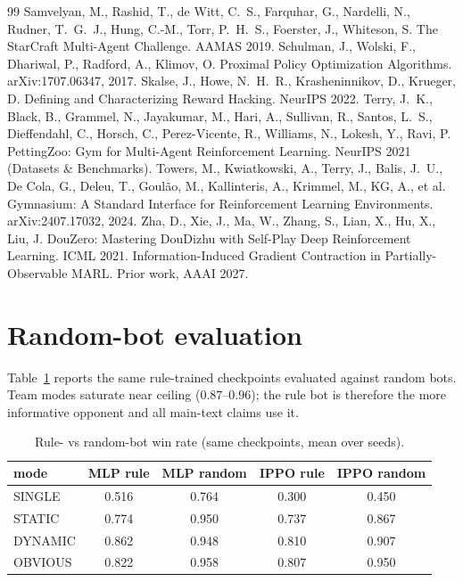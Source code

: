 \documentclass{article}
\begin{document}
\begin{thebibliography}{99}
 Samvelyan, M., Rashid, T., de Witt, C.~S., Farquhar, G., Nardelli, N., Rudner, T.~G.~J., Hung, C.-M., Torr, P.~H.~S., Foerster, J., Whiteson, S. The StarCraft Multi-Agent Challenge. AAMAS 2019.
 Schulman, J., Wolski, F., Dhariwal, P., Radford, A., Klimov, O. Proximal Policy Optimization Algorithms. arXiv:1707.06347, 2017.
 Skalse, J., Howe, N.~H.~R., Krasheninnikov, D., Krueger, D. Defining and Characterizing Reward Hacking. NeurIPS 2022.
 Terry, J.~K., Black, B., Grammel, N., Jayakumar, M., Hari, A., Sullivan, R., Santos, L.~S., Dieffendahl, C., Horsch, C., Perez-Vicente, R., Williams, N., Lokesh, Y., Ravi, P. PettingZoo: Gym for Multi-Agent Reinforcement Learning. NeurIPS 2021 (Datasets \& Benchmarks).
 Towers, M., Kwiatkowski, A., Terry, J., Balis, J.~U., De Cola, G., Deleu, T., Goul\~{a}o, M., Kallinteris, A., Krimmel, M., KG, A., et al. Gymnasium: A Standard Interface for Reinforcement Learning Environments. arXiv:2407.17032, 2024.
 Zha, D., Xie, J., Ma, W., Zhang, S., Lian, X., Hu, X., Liu, J. DouZero: Mastering DouDizhu with Self-Play Deep Reinforcement Learning. ICML 2021.
 Information-Induced Gradient Contraction in Partially-Observable MARL. Prior work, AAAI 2027.
\end{thebibliography}

\newpage
\appendix
\section{Random-bot evaluation}
Table~\ref{tab:opponent-appendix} reports the same rule-trained checkpoints
evaluated against random bots. Team modes saturate near ceiling
($0.87$--$0.96$); the rule bot is therefore the more informative opponent and
all main-text claims use it.

\begin{table}[h]
\centering
\small
\caption{Rule- vs random-bot win rate (same checkpoints, mean over seeds).}
\label{tab:opponent-appendix}
\begin{tabular}{lcccc}
\toprule
mode & MLP rule & MLP random & IPPO rule & IPPO random \\
\midrule
SINGLE & 0.516 & 0.764 & 0.300 & 0.450 \\
STATIC & 0.774 & 0.950 & 0.737 & 0.867 \\
DYNAMIC & 0.862 & 0.948 & 0.810 & 0.907 \\
OBVIOUS & 0.822 & 0.958 & 0.807 & 0.950 \\
\bottomrule
\end{tabular}
\end{table}
\end{document}
